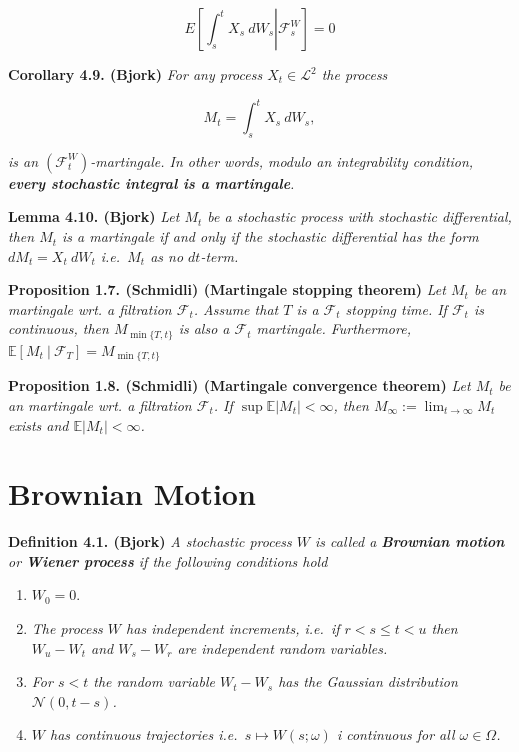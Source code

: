 \documentclass[a4paper,12pt,openany]{book}
\providecommand{\tightlist}{%
 \setlength{\itemsep}{0pt}\setlength{\parskip}{0pt}}
\begin{document}
\[
E\left[\left.\int_s^t X_s\ dW_s\right\vert\mathcal{F}_s^W\right]=0
\]

\textbf{Corollary 4.9. (Bjork)} \emph{For any process \(X_t\in\mathcal{L}^2\) the process}

\[
M_t=\int_s^t X_s\ dW_s,
\]

\emph{is an \((\mathcal{F}_t^W)\)-martingale. In other words, modulo an integrability condition, \textbf{every stochastic integral is a martingale}.}

\textbf{Lemma 4.10. (Bjork)} \emph{Let \(M_t\) be a stochastic process with stochastic differential, then \(M_t\) is a martingale if and only if the stochastic differential has the form \(dM_t=X_t\ dW_t\) i.e.~\(M_t\) as no \(dt\)-term.}

\textbf{Proposition 1.7. (Schmidli) (Martingale stopping theorem)} \emph{Let \(M_t\) be an martingale wrt. a filtration \(\mathcal F_t\). Assume that \(T\) is a \(\mathcal F_t\) stopping time. If \(\mathcal F_t\) is continuous, then \(M_{\min\{T,t\}}\) is also a \(\mathcal F_t\) martingale. Furthermore, \(\mathbb E[M_t\ \vert\ \mathcal F_T]=M_{\min\{T,t\}}\)}

\textbf{Proposition 1.8. (Schmidli) (Martingale convergence theorem)} \emph{Let \(M_t\) be an martingale wrt. a filtration \(\mathcal F_t\). If \(\sup\mathbb E\vert M_t\vert <\infty\), then \(M_\infty:=\lim_{t\to\infty} M_t\) exists and \(\mathbb E\vert M_t\vert<\infty\).}

\hypertarget{brownian-motion}{%
\section{Brownian Motion}\label{brownian-motion}}

\textbf{Definition 4.1. (Bjork)} \emph{A stochastic process \(W\) is called a \textbf{Brownian motion} or \textbf{Wiener process} if the following conditions hold}

\begin{enumerate}
\def\labelenumi{\arabic{enumi}.}
\tightlist
\item
  \(W_0=0\).
\item
  \emph{The process \(W\) has independent increments, i.e.~if \(r<s\le t< u\) then \(W_u-W_t\) and \(W_s-W_r\) are independent random variables.}
\item
  \emph{For \(s<t\) the random variable \(W_t-W_s\) has the Gaussian distribution \(\mathcal{N}(0,t-s)\).}
\item
  \emph{\(W\) has continuous trajectories i.e.~\(s\mapsto W(s;\omega)\) i continuous for all \(\omega \in\Omega\).}
\end{enumerate}
\end{document}
